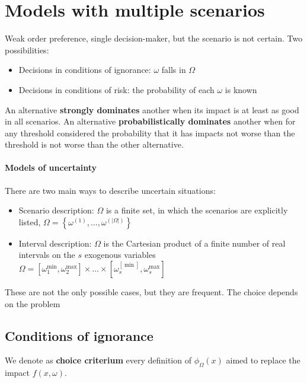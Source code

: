\section{Models with multiple scenarios}

Weak order preference, single decision-maker, but the scenario is not certain. Two possibilities: 
\begin{itemize}
	\item Decisions in conditions of ignorance: $\omega$ falls in $\Omega$
	
	\item Decisions in conditions of risk: the probability of each $\omega$ is known
\end{itemize}

An alternative \textbf{strongly dominates} another when its impact is at least as good in all scenarios. An alternative \textbf{probabilistically dominates} another when for any threshold considered the probability that it has impacts not worse than the threshold is not worse than the other alternative.

\paragraph{Models of uncertainty} There are two main ways to describe uncertain situations: 
\begin{itemize}
	\item Scenario description: $\Omega$ is a finite set, in which the scenarios are explicitly listed, $\Omega = \left\{\omega^{(1)}, \dots, \omega^{(|\Omega|)}\right\}$
	
	\item Interval description: $\Omega$ is the Cartesian product of a finite number of real intervals on the $s$ exogenous variables $\Omega = [\omega_1^{\min}, \omega_2^{\max}] \times  \dots  \times [\omega_s^[\min], \omega_s^{\max}]$
\end{itemize}

These are not the only possible cases, but they are frequent. The choice depends on the problem

\subsection{Conditions of ignorance}

We denote as \textbf{choice criterium} every definition of $\phi_\Omega (x)$ aimed to replace the impact $f(x, \omega)$.


